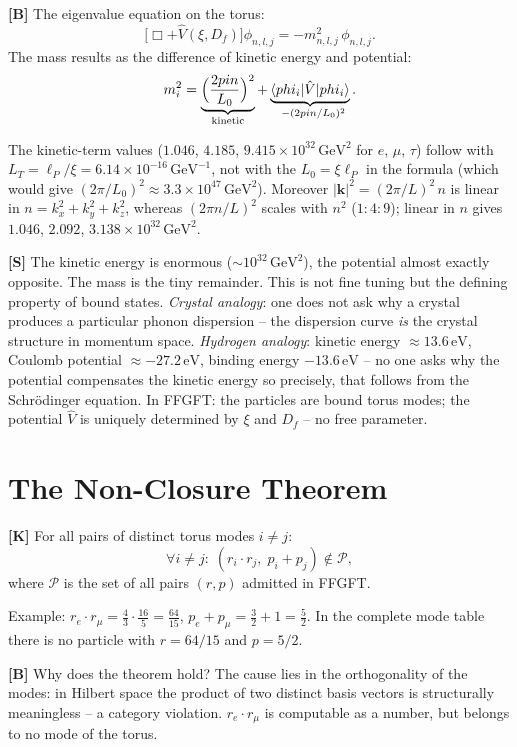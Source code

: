 \textbf{[B]} The eigenvalue equation on the torus:
\[
  \bigl[\Box + \hat V(\xi,D_f)\bigr]\phi_{n,l,j} = -m_{n,l,j}^2\,\phi_{n,l,j}.
\]
The mass results as the difference of kinetic energy and potential:
\[
  m_i^2
  = \underbrace{\Bigl(\frac{2\pi n}{L_0}\Bigr)^2}_{\text{kinetic}}
  + \underbrace{\langle\phi_i|\hat V|\phi_i\rangle}_{\approx\,-(2\pi n/L_0)^2}.
\]

The kinetic-term values ($1{.}046$, $4{.}185$, $9{.}415\times10^{32}\,\text{GeV}^2$ for $e$, $\mu$, $\tau$) follow with $L_T=\ell_P/\xi=6{.}14\times10^{-16}\,\text{GeV}^{-1}$, not with the $L_0=\xi\ell_P$ in the formula (which would give $(2\pi/L_0)^2\approx3{.}3\times10^{47}\,\text{GeV}^2$). Moreover $|\mathbf k|^2=(2\pi/L)^2\,n$ is linear in $n=k_x^2+k_y^2+k_z^2$, whereas $(2\pi n/L)^2$ scales with $n^2$ ($1:4:9$); linear in $n$ gives $1{.}046$, $2{.}092$, $3{.}138\times10^{32}\,\text{GeV}^2$.

\textbf{[S]} The kinetic energy is enormous ($\sim10^{32}\,\text{GeV}^2$),
the potential almost exactly opposite. The mass is the tiny remainder. This is
not fine tuning but the defining property of bound states. \emph{Crystal
analogy}: one does not ask why a crystal produces a particular phonon
dispersion -- the dispersion curve \emph{is} the crystal structure in momentum
space. \emph{Hydrogen analogy}: kinetic energy $\approx13{.}6\,\text{eV}$,
Coulomb potential $\approx-27{.}2\,\text{eV}$, binding energy $-13{.}6\,\text{eV}$
-- no one asks why the potential compensates the kinetic energy so precisely,
that follows from the Schrödinger equation. In FFGFT: the particles are bound
torus modes; the potential $\hat V$ is uniquely determined by $\xi$ and $D_f$
-- no free parameter.

\section{The Non-Closure Theorem}

\textbf{[K]} For all pairs of distinct torus modes $i\neq j$:
\[
  \forall i\neq j:\; (r_i\cdot r_j,\; p_i+p_j)\notin\mathcal P,
\]
where $\mathcal P$ is the set of all pairs $(r,p)$ admitted in FFGFT.

Example: $r_e\cdot r_\mu = \tfrac43\cdot\tfrac{16}{5} = \tfrac{64}{15}$,
$p_e+p_\mu = \tfrac32+1 = \tfrac52$. In the complete mode table there is no
particle with $r=64/15$ and $p=5/2$.

\textbf{[B]} Why does the theorem hold? The cause lies in the orthogonality of
the modes: in Hilbert space the product of two distinct basis vectors is
structurally meaningless -- a category violation. $r_e\cdot r_\mu$ is computable
as a number, but belongs to no mode of the torus.

